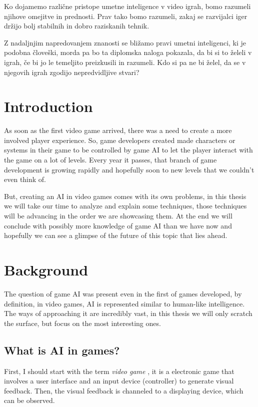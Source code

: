 \documentclass[a4paper, 12pt]{book}
\begin{document}
Ko dojamemo različne pristope umetne inteligence v video igrah, bomo razumeli njihove omejitve in prednosti. Prav tako bomo razumeli, zakaj se razvijalci iger držijo bolj stabilnih in dobro raziskanih tehnik.

Z nadaljnjim napredovanjem znanosti se bližamo pravi umetni inteligenci, ki je podobna človeški, morda pa bo ta diplomska naloga pokazala, da bi si to želeli v igrah, če bi jo le temeljito preizkusili in razumeli. Kdo si pa ne bi želel, da se v njegovih igrah zgodijo nepredvidljive stvari?



\mainmatter
\setcounter{page}{1}
\pagestyle{fancy}

\chapter{Introduction}

As soon as the first video game arrived, there was a need to create a more involved player experience. So, game developers created made characters or systems in their game to be controlled by game AI to let the player interact with the game on a lot of levels. Every year it passes, that branch of game development is growing rapidly and hopefully soon to new levels that we couldn't even think of.

But, creating an AI in video games comes with its own problems, in this thesis we will take our time to analyze and explain some techniques, those techniques will be advancing in the order we are showcasing them. At the end we will conclude with possibly more knowledge of game AI than we have now and hopefully we can see a glimpse of the future of this topic that lies ahead.


\chapter{Background}
\label{ch1}
The question of game AI \cite{AIwiki} was present even in the first of games developed, by definition, in video games, AI is represented similar to human-like intelligence. The ways of approaching it are incredibly vast, in this thesis we will only scratch the surface, but focus on the most interesting ones.

\section{What is AI in games?}
First, I should start with the term \emph{video game} \cite{VideoGameWiki}, it is a electronic game that involves a user interface and an input device (controller) to generate visual feedback. Then, the visual feedback is channeled to a displaying device, which can be observed. 
\end{document}
